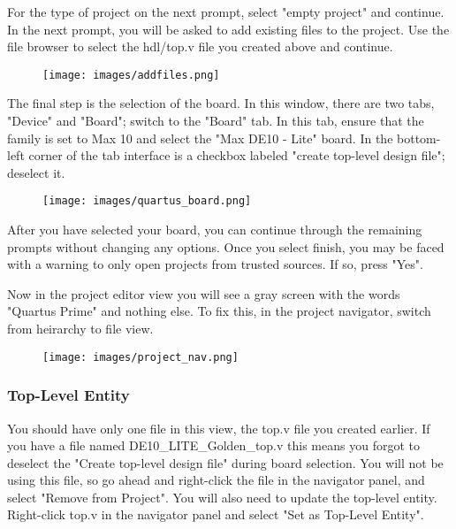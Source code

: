 \documentclass[12pt]{journal}
\begin{document}
For the type of project on the next prompt, select "empty project" and continue. In the next prompt, you will be asked to add existing files to the project. Use the file browser to select the hdl/top.v file you created above and continue.

\begin{figure}[H]
    \centering
    \texttt{[image: images/addfiles.png]}
\end{figure}

The final step is the selection of the board. In this window, there are two tabs, "Device" and "Board"; switch to the "Board" tab. In this tab, ensure that the family is set to Max 10 and select the "Max DE10 - Lite" board. In the bottom-left corner of the tab interface is a checkbox labeled "create top-level design file"; deselect it.

\begin{figure}[H]
    \centering
    \texttt{[image: images/quartus\_board.png]}
\end{figure}

After you have selected your board, you can continue through the remaining prompts without changing any options. Once you select finish, you may be faced with a warning to only open projects from trusted sources. If so, press "Yes".

Now in the project editor view you will see a gray screen with the words "Quartus Prime" and nothing else. To fix this, in the project navigator, switch from heirarchy to file view.

\begin{figure}[H]
    \centering
    \texttt{[image: images/project\_nav.png]}
\end{figure}

\subsubsection{Top-Level Entity}

You should have only one file in this view, the top.v file you created earlier. If you have a file named DE10\_LITE\_Golden\_top.v this means you forgot to deselect the "Create top-level design file" during board selection. You will not be using this file, so go ahead and right-click the file in the navigator panel, and select "Remove from Project". You will also need to update the top-level entity. Right-click top.v in the navigator panel and select "Set as Top-Level Entity".
\end{document}
